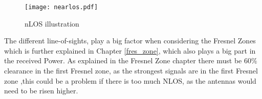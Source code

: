 \begin{figure}[H]
\centering
\texttt{[image: nearlos.pdf]}
\caption{nLOS illustration}
\label{nLOS}
\end{figure} 


The different line-of-sights, play a big factor when considering the Fresnel Zones which is further explained in Chapter \ref{fres_zone}, which also plays a big part in the received Power. As explained in the Fresnel Zone chapter there must be $60\%$ clearance in the first Fresnel zone, as the strongest signals are in the first Fresnel zone ,this could be a problem if there is too much NLOS, as the antennas would need to be risen higher.       


















